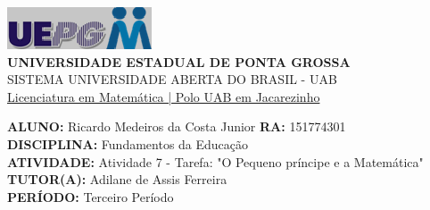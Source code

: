 \documentclass[a4paper, 12pt]{article}
\begin{document}
\begin{flushleft}\includegraphics{logo}\\
\textbf{UNIVERSIDADE ESTADUAL DE PONTA GROSSA} \\
SISTEMA UNIVERSIDADE ABERTA DO BRASIL - UAB \\
\underline{Licenciatura em Matemática | Polo UAB em Jacarezinho}\end{flushleft} 
\textbf{ALUNO:} Ricardo Medeiros da Costa Junior   \textbf{RA:} 151774301 \\
\textbf{DISCIPLINA:} Fundamentos da Educação\\
\textbf{ATIVIDADE:} Atividade 7 - Tarefa: "O Pequeno príncipe e a Matemática"\\
\textbf{TUTOR(A):} Adilane de Assis Ferreira\\
\textbf{PERÍODO:} Terceiro Período \\ \\
\end{document}

